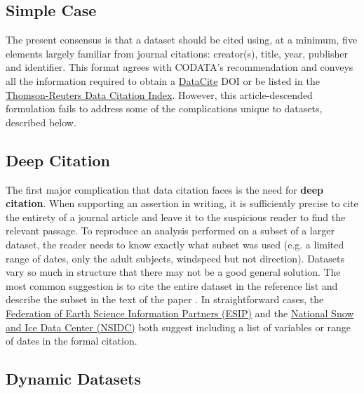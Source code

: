 \documentclass[10pt,twocolumn]{article}
\begin{document}
\subsection*{Simple Case}\label{simple-case}

The present consensus is that a dataset should be cited using, at a minimum, five elements largely familiar from journal citations: creator(s), title, year, publisher and identifier.
This format agrees with CODATA's recommendation\cite{codata-icsti_task_group_on_data_citation_standards_and_practices_out_2013} and conveys all the information required to obtain a \href{http://www.datacite.org/}{DataCite} DOI\cite{datacite_datacite_2013} or be listed in the \href{http://thomsonreuters.com/data-citation-index/}{Thomson-Reuters Data Citation Index}.
However, this article-descended formulation fails to address some of the complications unique to datasets, described below.

\subsection*{Deep Citation}\label{deep-citation}

The first major complication that data citation faces is the need for \textbf{deep citation}.
When supporting an assertion in writing, it is sufficiently precise to cite the entirety of a journal article and leave it to the suspicious reader to find the relevant passage.
To reproduce an analysis performed on a subset of a larger dataset, the reader needs to know exactly what subset was used (e.g. a limited range of dates, only the adult subjects, windspeed but not direction).
Datasets vary so much in structure that there may not be a good general solution.
The most common suggestion is to cite the entire dataset in the reference list and describe the subset in the text of the paper \cite{altman_a_2007}.
In straightforward cases, the \href{http://wiki.esipfed.org/index.php/Interagency_Data_Stewardship/Citations/provider_guidelines#Subset_Used}{Federation of Earth Science Information Partners (ESIP)} and the \href{http://nsidc.org/about/use_copyright.html}{National Snow and Ice Data Center (NSIDC)} both suggest including a list of variables or range of dates in the formal citation.

\subsection*{Dynamic Datasets}\label{dynamic-data}
\end{document}
